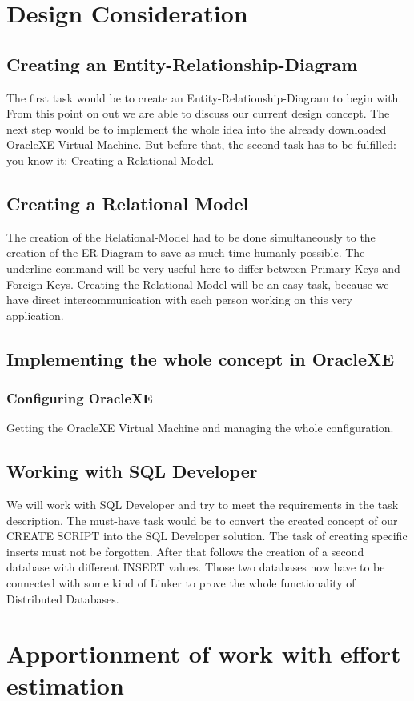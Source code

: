 \documentclass[11pt,a4paper]{article}
\begin{document}
\newpage
\section{Design Consideration}
\subsection{Creating an Entity-Relationship-Diagram}
The first task would be to create an Entity-Relationship-Diagram to begin with. From this point on out we are able to discuss our current design concept. The next step would be to implement the whole idea into the already downloaded OracleXE Virtual Machine. But before that, the second task has to be fulfilled: you know it: Creating a Relational Model.
\subsection{Creating a Relational Model}
The creation of the Relational-Model had to be done simultaneously to the creation of the ER-Diagram to save as much time humanly possible. The underline command will be very useful here to differ between Primary Keys and Foreign Keys. Creating the Relational Model will be an easy task, because we have direct intercommunication with each person working on this very application.
\subsection{Implementing the whole concept in OracleXE}
\subsubsection{Configuring OracleXE}
Getting the OracleXE Virtual Machine and managing the whole configuration. 
\subsection{Working with SQL Developer}
We will work with SQL Developer and try to meet the requirements in the task description. The must-have task would be to convert the created concept of our CREATE SCRIPT into the SQL Developer solution. The task of creating specific inserts must not be forgotten. After that follows the creation of a second database with different INSERT values. Those two databases now have to be connected with some kind of Linker to prove the whole functionality of Distributed Databases.

\newpage
\section{Apportionment of work with effort estimation}
\end{document}
